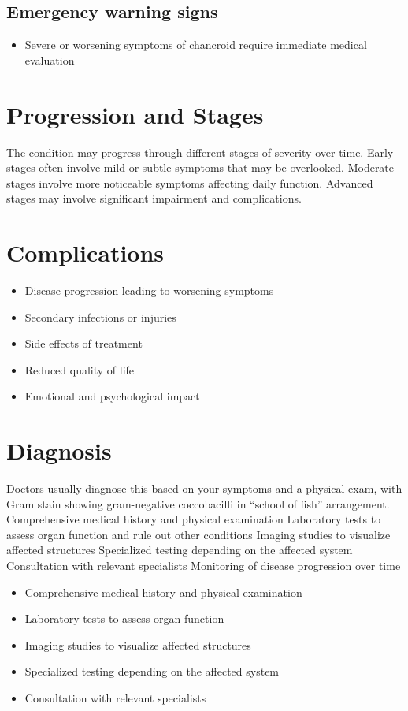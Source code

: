 \subsection{Emergency warning signs}
\begin{itemize}[noitemsep]
  \item Severe or worsening symptoms of chancroid require immediate medical evaluation
\end{itemize}
\section{Progression and Stages}
The condition may progress through different stages of severity over time. Early stages often involve mild or subtle symptoms that may be overlooked. Moderate stages involve more noticeable symptoms affecting daily function. Advanced stages may involve significant impairment and complications.
\section{Complications}
\begin{itemize}[noitemsep]
  \item Disease progression leading to worsening symptoms
  \item Secondary infections or injuries
  \item Side effects of treatment
  \item Reduced quality of life
  \item Emotional and psychological impact
\end{itemize}
\section{Diagnosis}
Doctors usually diagnose this based on your symptoms and a physical exam, with Gram stain showing gram-negative coccobacilli in ``school of fish'' arrangement. Comprehensive medical history and physical examination Laboratory tests to assess organ function and rule out other conditions Imaging studies to visualize affected structures Specialized testing depending on the affected system Consultation with relevant specialists Monitoring of disease progression over time

\begin{itemize}[noitemsep]
  \item Comprehensive medical history and physical examination
  \item Laboratory tests to assess organ function
  \item Imaging studies to visualize affected structures
  \item Specialized testing depending on the affected system
  \item Consultation with relevant specialists
\end{itemize}
